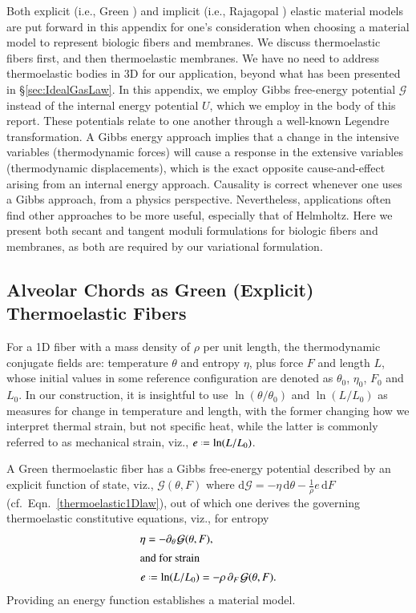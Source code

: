 \label{appImplicitElasticity}

Both explicit (i.e., Green \cite{Green41}) and implicit (i.e., Rajagopal \cite{Rajagopal03}) elastic material models are put forward in this appendix for one's consideration when choosing a material model to represent biologic fibers and membranes.  We discuss thermo\-elastic fibers first, and then thermo\-elastic membranes.  We have no need to address thermo\-elastic bodies in 3D for our application, beyond what has been presented in \S\ref{sec:IdealGasLaw}.  In this appendix, we employ Gibbs free-energy potential $\mathcal{G}$ instead of the internal energy potential $U$, which we employ in the body of this report.  These potentials relate to one another through a well-known Legendre transformation.  A Gibbs energy approach implies that a change in the intensive variables (thermo\-dynamic forces) will cause a response in the extensive variables (thermo\-dynamic displacements), which is the exact opposite cause-and-effect arising from an internal energy approach.  Causality is correct whenever one uses a Gibbs approach, from a physics perspective.  Nevertheless, applications often find other approaches to be more useful, especially that of Helmholtz.  Here we present both secant and tangent moduli formulations for biologic fibers and membranes, as both are required by our variational formulation.

\subsection{Alveolar Chords as Green (Explicit) Thermoelastic Fibers}

For a 1D fiber with a mass density of $\rho$ per unit length, the thermo\-dynamic conjugate fields are: temperature $\theta$ and entropy $\eta$, plus force $F$ and length $L$, whose initial values in some reference configuration are denoted as $\theta_0$, $\eta_0$, $F_0$ and $L_0$.  In our construction, it is insightful to use $\ln (\theta / \theta_0)$ and $\ln (L/L_0)$ as measures for change in temperature and length, with the former changing how we interpret thermal strain, but not specific heat, while the latter is commonly referred to as mechanical strain, viz., $e \defeq \ln (L/L_0)$.

A Green thermo\-elastic fiber has a Gibbs free-energy potential described by an explicit function of state, viz., $\mathcal{G} (\theta , F)$ where $\mathrm{d} \mathcal{G} = -\eta \, \mathrm{d} \theta - \tfrac{1}{\rho} e \, \mathrm{d}F$ (cf.~Eqn.~\ref{thermoelastic1Dlaw}), out of which one derives the governing thermo\-elastic constitutive equations, viz., for entropy
\begin{subequations}
    \label{thermoelasticFiber}
    \begin{align}
    \eta & = - \partial_{\theta\,} \mathcal{G} (\theta , F) ,
    \label{fiberEntropy} \\
    \intertext{and for strain}
    e & \defeq \ln ( L / L_0 ) = -\rho \, \partial_{F\,} \mathcal{G} (\theta, F) . 
    \label{fiberStrain}
    \end{align}
\end{subequations}
Providing an energy function establishes a material model.

